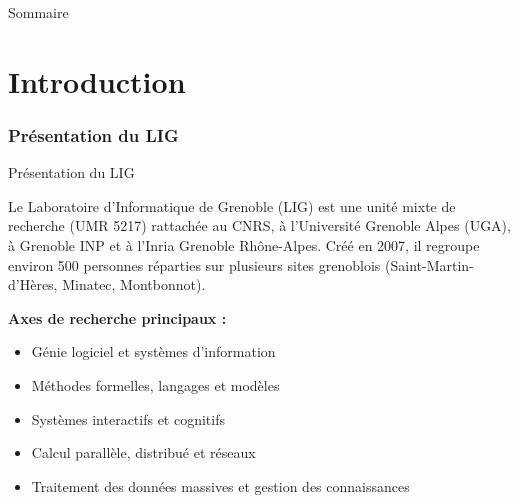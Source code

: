 \documentclass[aspectratio=43,8pt]{beamer}
\begin{document}
\begin{frame}{Sommaire}
\tableofcontents[part=1]  %
\tableofcontents[part=2] 
\end{frame}

\part{Introduction}

\section{Présentation du LIG}
\begin{frame}{Présentation du LIG}
\begin{card}
Le Laboratoire d’Informatique de Grenoble (LIG) est une unité mixte de recherche (UMR 5217) rattachée au CNRS, à l’Université Grenoble Alpes (UGA), à Grenoble INP et à l’Inria Grenoble Rhône-Alpes.  
Créé en 2007, il regroupe environ 500 personnes réparties sur plusieurs sites grenoblois (Saint-Martin-d’Hères, Minatec, Montbonnot).  

\medskip
\textbf{Axes de recherche principaux :}
\begin{itemize}
    \item Génie logiciel et systèmes d’information
    \item Méthodes formelles, langages et modèles
    \item Systèmes interactifs et cognitifs
    \item Calcul parallèle, distribué et réseaux
    \item Traitement des données massives et gestion des connaissances
\end{itemize}
\end{card}
\end{frame}
\end{document}

